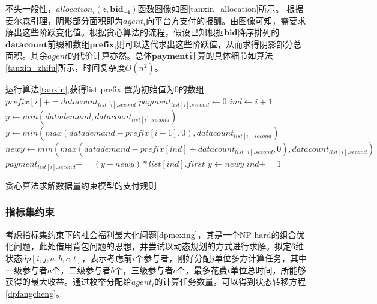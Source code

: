 \documentclass[promaster]{thesis-uestc}
\begin{document}
不失一般性，$allocation_i(z,\mathbf{bid_{-i}})$函数图像如图\ref{tanxin_allocation}所示。
根据麦尔森引理，阴影部分面积即为$agent_i$向平台方支付的报酬。由图像可知，需要求解出这些阶跃变化值。根据贪心算法的流程，假设已知根据$\mathbf{bid}$降序排列的$\mathbf{datacount}$前缀和数组$\mathbf{prefix}$,则可以迭代求出这些阶跃值，从而求得阴影部分总面积。其余$agent$的代价计算亦然。总体$\mathbf{payment}$计算的具体细节如算法\ref{tanxin_zhifu}所示，时间复杂度$O(n^2)$。

\begin{algorithm}[h]
    运行算法\ref{tanxin},获得list\;
    prefix 置为初始值为0的数组\;
    {
        $prefix[i]  += datacount_{list[i].second}$\;
    }
    {
        $payment_{list[i].second} \leftarrow 0$\;
        $ind \leftarrow i + 1$
        {
            $y \leftarrow min(datademand,datacount_{list[i].second})$\;
        }{
        $y \leftarrow min(max(datademand - prefix[i-1],0),datacount_{list[i].second})$\;
        }
        {
            $newy \leftarrow min(max(datademand - prefix[ind]+ datacount_{list[i].second},0),datacount_{list[i].second})$\;
            $payment_{list[i].second} += (y - newy)*list[ind].first$\;
            $y \leftarrow newy$\;
            $ind += 1$\;
        }
    }
\caption{贪心算法求解数据量约束模型的支付规则}
\label{tanxin_zhifu}
\end{algorithm}


\FloatBarrier

\subsubsection{指标集约束}
\label{dptou}

考虑指标集约束下的社会福利最大化问题\ref{dpmoxing}，其是一个NP-hard的组合优化问题，此处借用背包问题的思想，并尝试以动态规划的方式进行求解。拟定6维状态$dp[i,j,a,b,c,t]$，表示考虑前$i$个参与者，刚好分配$j$单位多方计算任务，其中一级参与者$a$个，二级参与者$b$个，三级参与者$c$个，最多花费$t$单位总时间，所能够获得的最大收益。通过枚举分配给$agent_i$的计算任务数量，可以得到状态转移方程\ref{dpfangcheng}。
\end{document}
